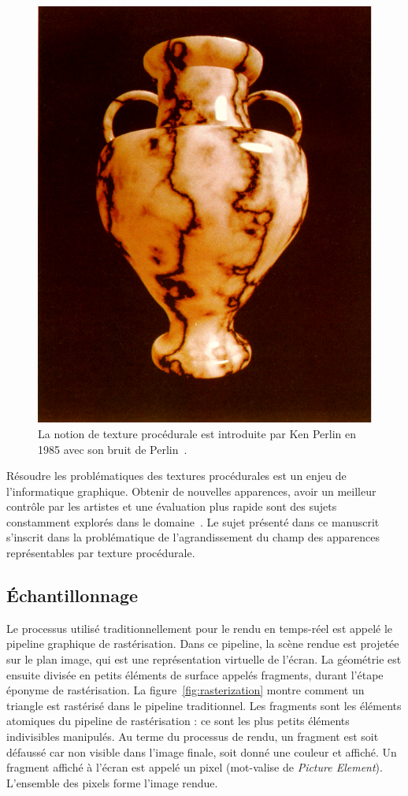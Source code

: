 \begin{figure}[h]
    \centering
    \includegraphics[width=.5\textwidth]{contenu/resources/images/perlin-noise}
    \caption[Bruit de Perlin]{La notion de texture procédurale est introduite par Ken Perlin en 1985 avec son bruit de Perlin~\cite{perlin_image_1985}.}
    \label{fig:perlin-noise}
\end{figure}

Résoudre les problématiques des textures procédurales est un enjeu de l'informatique graphique. Obtenir de nouvelles apparences, avoir un meilleur contrôle par les artistes et une évaluation plus rapide sont des sujets constamment explorés dans le domaine~\cite{heitz_high-performance_2018, tricard_procedural_2019, lutz_cyclostationary-gaussian_2021, baldi_differentiable_2023}. Le sujet présenté dans ce manuscrit s'inscrit dans la problématique de l'agrandissement du champ des apparences représentables par texture procédurale.

\subsection*{Échantillonnage}

Le processus utilisé traditionnellement pour le rendu en temps-réel est appelé le pipeline graphique de rastérisation. Dans ce pipeline, la scène rendue est projetée sur le plan image, qui est une représentation virtuelle de l'écran. La géométrie est ensuite divisée en petits éléments de surface appelés fragments, durant l'étape éponyme de rastérisation. La figure~\ref{fig:rasterization} montre comment un triangle est rastérisé dans le pipeline traditionnel. Les fragments sont les éléments atomiques du pipeline de rastérisation : ce sont les plus petits éléments indivisibles manipulés. Au terme du processus de rendu, un fragment est soit défaussé car non visible dans l'image finale, soit donné une couleur et affiché. Un fragment affiché à l'écran est appelé un pixel (mot-valise de \textit{Picture Element}). L'ensemble des pixels forme l'image rendue.

